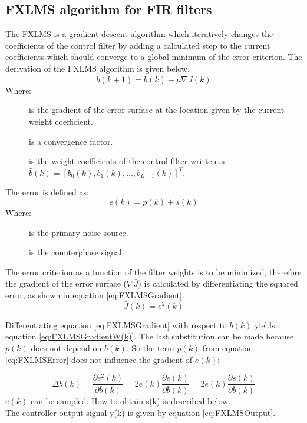 \subsection{FXLMS algorithm for FIR filters}\label{subsec:fxlms}
The FXLMS is a gradient descent algorithm which iteratively changes the coefficients of the control filter by adding a calculated step to the current coefficients which should converge to a global minimum of the error criterion. The derivation of the FXLMS algorithm is given below. 
\begin{equation}\label{eq:FXLMSNewCoef}
\bar{b}(k+1) = \bar{b}(k) - \mu\nabla \bar{J}(k)
\end{equation}
Where:
\begin{description}
	\item[] is the gradient of the error surface at the location given by the current weight coefficient.
	\item[\text{$\mu$}] is a convergence factor.
	\item[] is the weight coefficients of the control filter written as  $\bar{b}(k)=[b_0(k),b_1(k) ,\dotsc, b_{L-1}(k)]^T$.
\end{description}
The error is defined as:
\begin{equation}\label{eq:FXLMSError}
e(k) = p(k) + s(k)
\end{equation}
Where:
\begin{description}
	\item[] is the primary noise source.
	\item[] is the counterphase signal.
\end{description}

The error criterion as a function of the filter weights is to be minimized, therefore the gradient of the error surface ($\nabla \bar{J}$) is calculated by differentiating the squared error, as shown in equation \ref{eq:FXLMSGradient}.
\begin{equation}\label{eq:FXLMSGradient}
\bar{J}(k) = e^2(k)
\end{equation}

Differentiating equation \ref{eq:FXLMSGradient} with respect to $b(k)$ yields equation \ref{eq:FXLMSGradientW(k)}. The last substitution can be made because $p(k)$ does not depend on $b(k)$. So the term $p(k)$ from equation \ref{eq:FXLMSError} does not influence the gradient of $e(k)$:

\begin{equation}\label{eq:FXLMSGradientW(k)}
\Delta \bar{b}(k) = \frac{\partial e^2(k)}{\partial \bar{b}(k)} = 2e(k)\frac{\partial e(k)}{\partial \bar{b}(k)} = 2e(k)\frac{\partial s(k)}{\partial \bar{b}(k)}
\end{equation}
$e(k)$ can be sampled. How to obtain s(k) is described below. \\
The controller output signal y(k) is given by equation \ref{eq:FXLMSOutput}.

